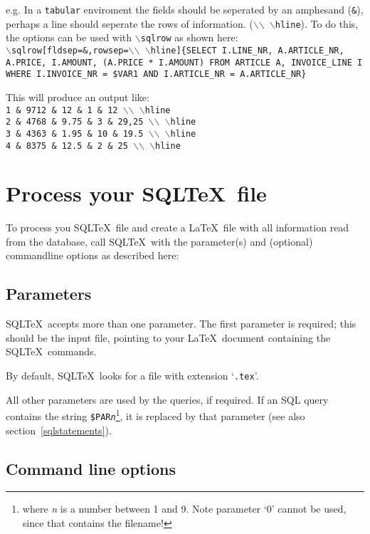 \documentclass{article}
\newcommand{\bs}{\begin{math}\backslash\end{math}}
\newcommand{\vs}{\vspace{3mm}}
\begin{document}
e.g. In a \texttt{tabular} enviroment the fields should be seperated by an amphesand (\texttt{\&}),
perhaps a line should seperate the rows of information. (\texttt{\bs\bs~\bs hline}).
To do this, the options can be used with \texttt{\bs sqlrow} as shown here: \\
\texttt{\bs sqlrow[fldsep=\&,rowsep=\bs\bs~\bs hline]\{SELECT I.LINE\_NR, A.ARTICLE\_NR, 
A.PRICE, I.AMOUNT, (A.PRICE * I.AMOUNT) FROM ARTICLE A, INVOICE\_LINE I WHERE I.INVOICE\_NR = \$VAR1 
AND I.ARTICLE\_NR = A.ARTICLE\_NR\}}

\vs

This will produce an output like: \\
\texttt{1 \& 9712 \& 12 \& 1 \& 12 \bs\bs~\bs hline \\
2 \& 4768 \& 9.75 \& 3 \& 29,25 \bs\bs~\bs hline \\
3 \& 4363 \& 1.95 \& 10 \& 19.5 \bs\bs~\bs hline \\
4 \& 8375 \& 12.5 \& 2 \& 25 \bs\bs~\bs hline}


\section{Process your SQL\TeX\ file}

To process you SQL\TeX\ file and create a \LaTeX\ file with all information read from
the database, call SQL\TeX\ with the parameter(s) and (optional) commandline options as
described here:

\subsection{Parameters}\label{params}

SQL\TeX\ accepts more than one parameter. The first parameter is required; this should
be the input file, pointing to your \LaTeX\ document containing the SQL\TeX\ commands.

By default, SQL\TeX\ looks for a file with extension `\texttt{.tex}'.

\vs

All other parameters are used by the queries, if required. If an SQL query contains the
string \texttt{\$PAR\textit{n}}\footnote{where \textit{n} is a number between 1 and 9. Note 
parameter `0' cannot be used, since that contains the filename!}, it is replaced by that parameter
(see also section~\ref{sqlstatements}).

\subsection{Command line options}\label{cmdline}
\end{document}
